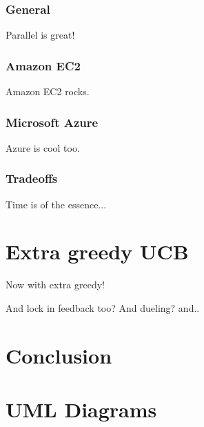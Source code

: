 \documentclass[nojss]{jss}\usepackage[]{graphicx}\usepackage[]{color}
\begin{document}
\subsubsection{General}

Parallel is great!

\subsubsection{Amazon EC2}

Amazon EC2 rocks.

\subsubsection{Microsoft Azure}

Azure is cool too.

\subsubsection{Tradeoffs}

Time is of the essence...

\section{Extra greedy UCB}

Now with extra greedy!

And lock in feedback too? And dueling? and..

\section{Conclusion}
\label{sec:conc4}

\section{UML Diagrams}
\end{document}
